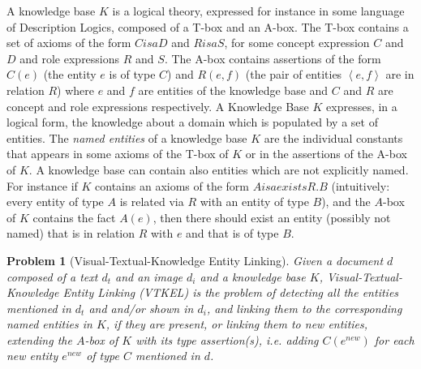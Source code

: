 \documentclass[11pt,a4paper]{article}
\newtheorem{problem}{Problem}
\begin{document}
A knowledge base $K$ is a logical theory, expressed for instance in
some language of Description Logics, composed of a T-box and an
A-box. The T-box contains a set of 
axioms of the form $C isa D$ and $R isa S$, for some concept
expression $C$ and $D$ and role expressions $R$ and $S$.  The A-box
contains assertions of the form $C(e)$ (the entity $e$ is of type $C$)
and $R(e,f)$ (the pair of entities $\left<e,f\right>$ are in relation
$R$) where $e$ and $f$ are entities of the knowledge base and $C$ and
$R$ are concept and role expressions respectively. A
Knowledge Base $K$ expresses, in a logical form, the knowledge about
a domain which is populated by a set of entities. The \emph{named
	entities} of a knowledge base $K$ are the individual constants that
appears in some axioms of the T-box of $K$ or in the assertions of
the A-box of $K$. A knowledge base can contain also entities which
are not explicitly named. For instance if $K$ contains an axioms of
the form $A isa exists R.B$ (intuitively: every entity of type $A$ is
related via $R$ with an entity of type $B$), and the $A$-box of $ K$
contains the fact $A(e)$, then there should exist an entity (possibly
not named) that is in relation $R$ with $e$ and that is of type $B$.


\label{sec:vtkel}
\begin{problem}[Visual-Textual-Knowledge Entity Linking]
	Given a document $d$ composed of a text $d_t$ and an image $d_i$ and a knowledge base $K$, \emph{Visual-Textual-Knowledge Entity Linking (VTKEL)} is the problem of detecting all the entities mentioned in $d_t$ and and/or shown in $d_i$, and linking them to the corresponding named entities in $K$, if they are present, or linking them to new entities, extending the $A$-box of $K$ with its type assertion(s),  i.e. adding $C(e^{new})$ for each new entity $e^{new}$ of type $C$ mentioned in $d$. 
\end{problem}
\end{document}
